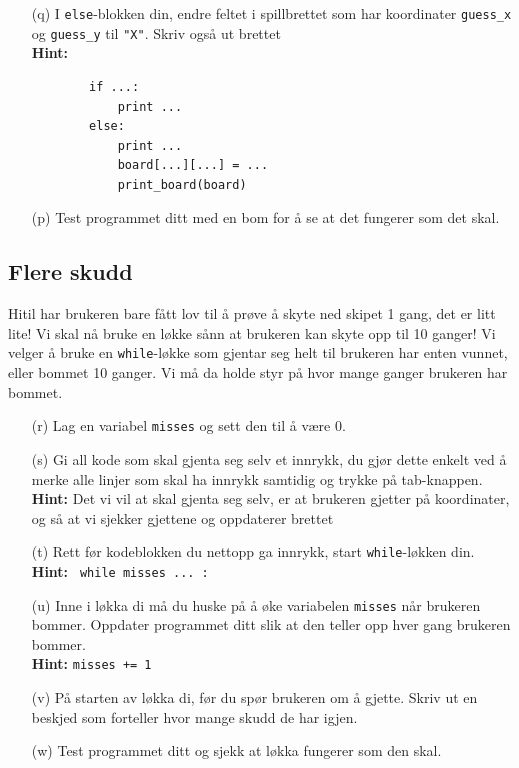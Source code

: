 \documentclass[a4paper, 11pt, notitlepage]{article}
\begin{document}
\begin{itemize}
	\item[(q)] I \verb+else+-blokken din, endre feltet i spillbrettet som har koordinater \verb+guess_x+ og \verb+guess_y+ til \verb+"X"+. Skriv også ut brettet \\
	\textbf{Hint:} \begin{lstlisting}
		if ...:
			print ...
		else:
			print ...
			board[...][...] = ...
			print_board(board)
	\end{lstlisting}
	\item[(p)] Test programmet ditt med en bom for å se at det fungerer som det skal.
\end{itemize}

\subsection*{Flere skudd}

Hitil har brukeren bare fått lov til å prøve å skyte ned skipet 1 gang, det er litt lite! Vi skal nå bruke en løkke sånn at brukeren kan skyte opp til 10 ganger! Vi velger å bruke en \verb+while+-løkke som gjentar seg helt til brukeren har enten vunnet, eller bommet 10 ganger. Vi må da holde styr på hvor mange ganger brukeren har bommet.

\begin{itemize}
	\item[(r)] Lag en variabel \verb+misses+ og sett den til å være 0.
	\item[(s)] Gi all kode som skal gjenta seg selv et innrykk, du gjør dette enkelt ved å merke alle linjer som skal ha innrykk samtidig og trykke på tab-knappen. \\ \textbf{Hint: } Det vi vil at skal gjenta seg selv, er at brukeren gjetter på koordinater, og så at vi sjekker gjettene og oppdaterer brettet
	\item[(t)] Rett før kodeblokken du nettopp ga innrykk, start \verb+while+-løkken din. \\ 
	\textbf{Hint:} \verb+ while misses ... :+
	\item[(u)] Inne i løkka di må du huske på å øke variabelen \verb+misses+ når brukeren bommer. Oppdater programmet ditt slik at den teller opp hver gang brukeren bommer.  \\ \textbf{Hint: } \verb!misses += 1!
	\item[(v)] På starten av løkka di, før du spør brukeren om å gjette. Skriv ut en beskjed som forteller hvor mange skudd de har igjen.
	\item[(w)] Test programmet ditt og sjekk at løkka fungerer som den skal.
\end{itemize}
\end{document}
